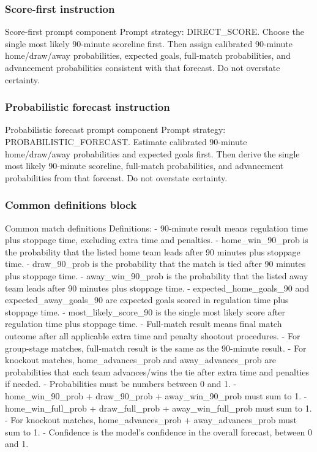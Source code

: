 \documentclass[sigconf,nonacm]{acmart}
\newcommand{\promptheadingbreak}{\leavevmode\par\nopagebreak[4]}
\begin{document}
\subsubsection*{Score-first instruction}
\promptheadingbreak
\begin{promptbox}{Score-first prompt component}
Prompt strategy: DIRECT_SCORE.
Choose the single most likely 90-minute scoreline first.
Then assign calibrated 90-minute home/draw/away probabilities, expected goals, full-match probabilities, and advancement probabilities consistent with that forecast.
Do not overstate certainty.
\end{promptbox}

\subsubsection*{Probabilistic forecast instruction}
\promptheadingbreak
\begin{promptbox}{Probabilistic forecast prompt component}
Prompt strategy: PROBABILISTIC_FORECAST.
Estimate calibrated 90-minute home/draw/away probabilities and expected goals first.
Then derive the single most likely 90-minute scoreline, full-match probabilities, and advancement probabilities from that forecast.
Do not overstate certainty.
\end{promptbox}

\subsubsection*{Common definitions block}
\promptheadingbreak
\begin{promptbox}{Common match definitions}
Definitions:
- 90-minute result means regulation time plus stoppage time, excluding extra time and penalties.
- home_win_90_prob is the probability that the listed home team leads after 90 minutes plus stoppage time.
- draw_90_prob is the probability that the match is tied after 90 minutes plus stoppage time.
- away_win_90_prob is the probability that the listed away team leads after 90 minutes plus stoppage time.
- expected_home_goals_90 and expected_away_goals_90 are expected goals scored in regulation time plus stoppage time.
- most_likely_score_90 is the single most likely score after regulation time plus stoppage time.
- Full-match result means final match outcome after all applicable extra time and penalty shootout procedures.
- For group-stage matches, full-match result is the same as the 90-minute result.
- For knockout matches, home_advances_prob and away_advances_prob are probabilities that each team advances/wins the tie after extra time and penalties if needed.
- Probabilities must be numbers between 0 and 1.
- home_win_90_prob + draw_90_prob + away_win_90_prob must sum to 1.
- home_win_full_prob + draw_full_prob + away_win_full_prob must sum to 1.
- For knockout matches, home_advances_prob + away_advances_prob must sum to 1.
- Confidence is the model's confidence in the overall forecast, between 0 and 1.
\end{promptbox}
\end{document}
